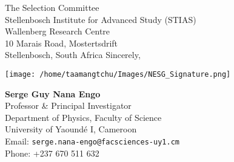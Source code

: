 \documentclass[11pt,a4paper]{letter}
\newcommand{\email}[1]{\texttt{#1}}
\begin{document}
\begin{letter}{The Selection Committee\\ Stellenbosch Institute for Advanced Study (STIAS)\\ Wallenberg Research Centre\\ 10 Marais Road, Mostertsdrift\\ Stellenbosch, South Africa}
Sincerely,

\texttt{[image: /home/taamangtchu/Images/NESG\_Signature.png]}

\noindent\textbf{Serge Guy Nana Engo} \\
Professor \& Principal Investigator \\
Department of Physics, Faculty of Science \\
University of Yaoundé I, Cameroon \\
Email: \email{serge.nana-engo@facsciences-uy1.cm} \\
Phone: +237 670 511 632

\end{letter}
\end{document}
